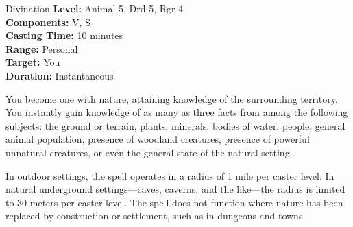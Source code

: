 {Divination}
{
	\textbf{Level:}
	Animal 5, Drd 5, Rgr 4\\
	\textbf{Components:}
	V, S\\
	\textbf{Casting Time:}
	10 minutes\\
	\textbf{Range:}
	Personal\\
	\textbf{Target:}
	You\\
	\textbf{Duration:}
	Instantaneous\\
}
{
	You become one with nature, attaining knowledge of the surrounding territory. You instantly gain knowledge of as many as three facts from among the following subjects: the ground or terrain, plants, minerals, bodies of water, people, general animal population, presence of woodland creatures, presence of powerful unnatural creatures, or even the general state of the natural setting.

	In outdoor settings, the spell operates in a radius of 1 mile per caster level. In natural underground settings---caves, caverns, and the like---the radius is limited to 30 meters per caster level. The spell does not function where nature has been replaced by construction or settlement, such as in dungeons and towns.

}
